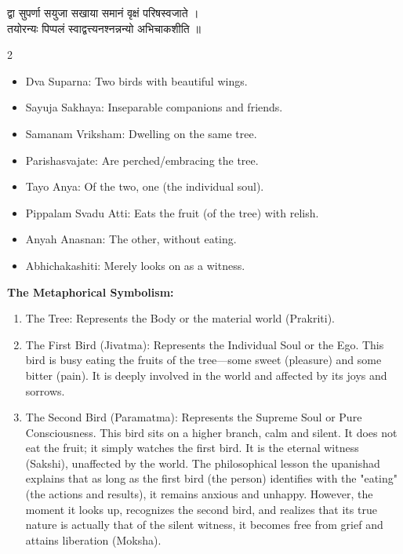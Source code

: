 \documentclass[12pt]{article}
\begin{document}
\thispagestyle{plain}
\vspace*{-0.4cm}
\begin{center}
{\devafont\Large द्वा सुपर्णा सयुजा सखाया समानं वृक्षं परिषस्वजाते ।}\\[0.7em]
{\devafont\Large तयोरन्यः पिप्पलं स्वाद्वत्त्यनश्नन्नन्यो अभिचाकशीति ॥}\\[0.7em]
\end{center}
\vspace{1em}
\begin{multicols}{2}
\noindent
\begin{itemize}[leftmargin=1.2em, itemsep=0.25em]
  \item Dva Suparna: Two birds with beautiful wings.
  \item Sayuja Sakhaya: Inseparable companions and friends.
  \item Samanam Vriksham: Dwelling on the same tree.
  \item Parishasvajate: Are perched/embracing the tree.
  \item Tayo Anya: Of the two, one (the individual soul).
  \item Pippalam Svadu Atti: Eats the fruit (of the tree) with relish.
  \item Anyah Anasnan: The other, without eating.
  \item Abhichakashiti: Merely looks on as a witness.
\end{itemize}
\vspace{0.6em}
\noindent\textbf{The Metaphorical Symbolism:}
\begin{enumerate}[leftmargin=1.4em, itemsep=0.35em]
  \item The Tree: Represents the Body or the material world (Prakriti).
  \item The First Bird (Jivatma): Represents the Individual Soul or the Ego. This bird is busy eating the fruits of the tree—some sweet (pleasure) and some bitter (pain). It is deeply involved in the world and affected by its joys and sorrows.
  \item The Second Bird (Paramatma): Represents the Supreme Soul or Pure Consciousness. This bird sits on a higher branch, calm and silent. It does not eat the fruit; it simply watches the first bird. It is the eternal witness (Sakshi), unaffected by the world. The philosophical lesson  the upanishad explains that as long as the first bird (the person) identifies with the "eating" (the actions and results), it remains anxious and unhappy. However, the moment it looks up, recognizes the second bird, and realizes that its true nature is actually that of the silent witness, it becomes free from grief and attains liberation (Moksha).
\end{enumerate}
\end{multicols}
\newpage
\end{document}
